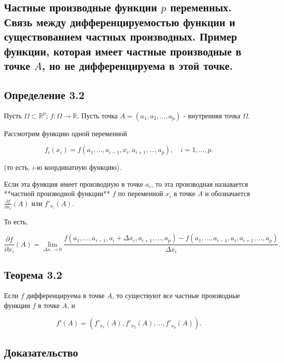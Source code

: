{
\subsection{Частные производные функции \(p\) переменных. Связь между дифференцируемостью функции и существованием частных производных. Пример функции, которая имеет частные производные в точке \( A \), но не дифференцируема в этой точке.}

\subsection*{Определение 3.2}

Пусть \( \Omega \subset \mathbb{R}^p \); \( f: \Omega \to \mathbb{R} \). Пусть точка \( A = (a_1, a_2, ..., a_p) \) - внутренняя точка \( \Omega \).

Рассмотрим функцию одной переменной 



\[
f_i(x_i) = f(a_1, ..., a_{i-1}, x_i, a_{i+1}, ..., a_p), \quad i = 1, ..., p.
\]



(то есть, \( i \)-ю координатную функцию).  

Если эта функция имеет производную в точке \( a_i \), то эта производная называется **частной производной функции** \( f \) по переменной \( x_i \) в точке \( A \) и обозначается \( \frac{\partial f}{\partial x_i}(A) \) или \( f'_{x_i}(A) \).  

То есть,



\[
\frac{\partial f}{\partial x_i}(A) = \lim_{\Delta x_i \to 0} \frac{f(a_1, ..., a_{i-1}, a_i + \Delta x_i, a_{i+1}, ..., a_p) - f(a_1, ..., a_{i-1}, a_i, a_{i+1}, ..., a_p)}{\Delta x_i}.
\]



\subsection*{Теорема 3.2}

Если \( f \) дифференцируема в точке \( A \), то существуют все частные производные функции \( f \) в точке \( A \), и  



\[
f'(A) = (f'_{x_1}(A), f'_{x_2}(A), ..., f'_{x_p}(A)).
\]

\subsection*{Доказательство}

}
